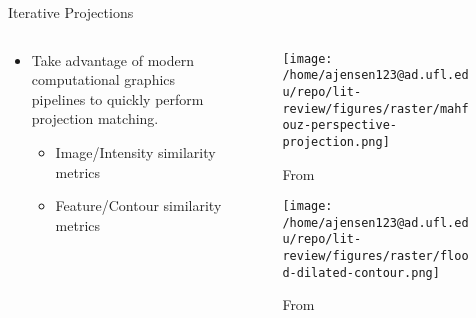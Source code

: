 \documentclass[presentation, aspectratio=1610]{beamer}
\begin{document}
\begin{frame}[label={sec:org1732476}]{Iterative Projections}
\begin{columns}
\begin{column}{0.54\columnwidth}
\begin{itemize}
\item Take advantage of modern computational graphics pipelines to quickly perform projection matching.
\begin{itemize}
\item Image/Intensity similarity metrics \autocite{mahfouzRobustMethodRegistration2003}
\item Feature/Contour similarity metrics \autocite{floodAutomatedRegistration3D2018}
\end{itemize}
\end{itemize}
\end{column}
\begin{column}{0.6\columnwidth}
\begin{figure}[htbp]
\centering
\texttt{[image: /home/ajensen123@ad.ufl.edu/repo/lit-review/figures/raster/mahfouz-perspective-projection.png]}
\caption{From \autocite{mahfouzRobustMethodRegistration2003}}
\end{figure}
\begin{figure}[htbp]
\centering
\texttt{[image: /home/ajensen123@ad.ufl.edu/repo/lit-review/figures/raster/flood-dilated-contour.png]}
\caption{From \autocite{floodAutomatedRegistration3D2018}}
\end{figure}
\end{column}
\end{columns}
\end{frame}
\end{document}
